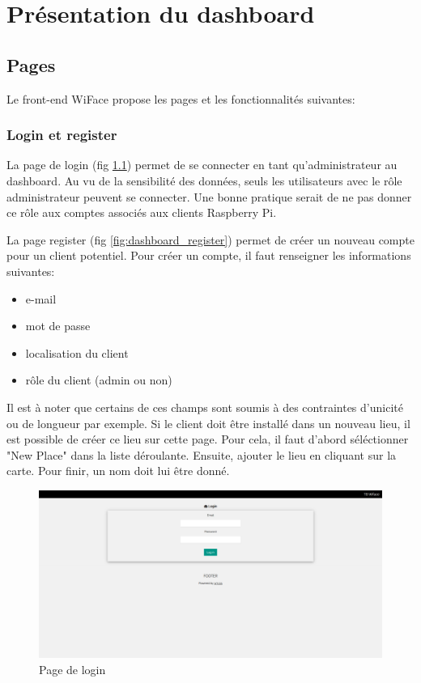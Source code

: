 \chapter{Présentation du dashboard}
\label{ch:dashboard}
\section{Pages}
Le front-end WiFace propose les pages et les fonctionnalités suivantes:
\subsection{Login et register}

La page de login (fig \ref{fig:dashboard_login}) permet de se connecter en tant qu'administrateur au dashboard.
Au vu de la sensibilité des données, seuls les utilisateurs avec le rôle administrateur peuvent se connecter.
Une bonne pratique serait de ne pas donner ce rôle aux comptes associés aux clients Raspberry Pi.

La page register (fig \ref{fig:dashboard_register}) permet de créer un nouveau compte pour un client potentiel.
Pour créer un compte, il faut renseigner les informations suivantes:
\begin{itemize}
    \item e-mail
    \item mot de passe
    \item localisation du client
    \item rôle du client (admin ou non) 
\end{itemize}

Il est à noter que certains de ces champs sont soumis à des contraintes d'unicité ou de longueur par exemple.
Si le client doit être installé dans un nouveau lieu, il est possible de créer ce lieu sur cette page. 
Pour cela, il faut d'abord séléctionner "New Place" dans la liste déroulante. Ensuite, ajouter le lieu en cliquant sur la carte. Pour
finir, un nom doit lui être donné. 

\clearpage
\newpage
\thispagestyle{empty}
\begin{landscape}
    \centering
\thispagestyle{empty}
\begin{figure}[h]
	\includegraphics[width=\linewidth]{images/dashboard/login.png}
	\caption{Page de login}
	\label{fig:dashboard_login}
\end{figure}
\end{landscape}

